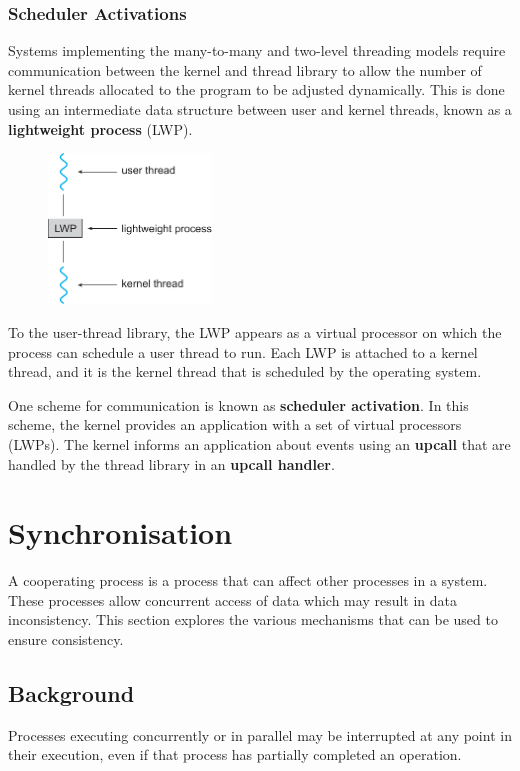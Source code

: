 \documentclass{article}
\begin{document}
\subsubsection{Scheduler Activations}
Systems implementing the many-to-many and two-level threading models
require communication between the kernel and thread library to allow
the number of kernel threads allocated to the program to be adjusted
dynamically. This is done using an intermediate data structure between
user and kernel threads, known as a \textbf{lightweight process} (LWP).
\begin{figure}[H]
    \centering
    \includegraphics[height = 4cm]{figures/lwp.pdf}
\end{figure}
To the user-thread library, the LWP appears as a virtual processor on
which the process can schedule a user thread to run. Each LWP is
attached to a kernel thread, and it is the kernel thread that is
scheduled by the operating system.

One scheme for communication is known as \textbf{scheduler activation}.
In this scheme, the kernel provides an application with a set of virtual
processors (LWPs). The kernel informs an application about events using
an \textbf{upcall} that are handled by the thread library in an
\textbf{upcall handler}.
\section{Synchronisation}
A cooperating process is a process that can affect other processes in a
system. These processes allow concurrent access of data which may
result in data inconsistency. This section explores the various
mechanisms that can be used to ensure consistency.
\subsection{Background}
Processes executing concurrently or in parallel may be interrupted at
any point in their execution, even if that process has partially
completed an operation.
\end{document}
